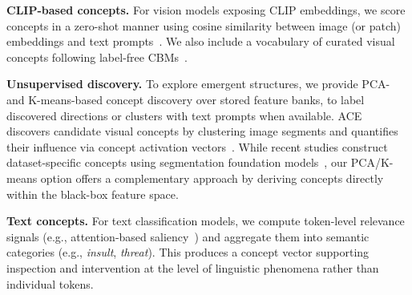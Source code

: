 \documentclass[sigconf,review,screen]{acmart}
\begin{document}
\noindent\textbf{CLIP-based concepts.}
For vision models exposing CLIP embeddings, we score concepts in a zero-shot manner using cosine similarity between image (or patch) embeddings and text prompts~\cite{radford_learning_2021}. We also include a vocabulary of curated visual concepts following label-free CBMs~\cite{oikarinen_label-free_2022}.

\noindent\textbf{Unsupervised discovery.}
To explore emergent structures, we provide PCA- and K-means-based concept discovery over stored feature banks, to label discovered directions or clusters with text prompts when available. ACE~\cite{Ghorbani2019ACE} discovers candidate visual concepts by clustering image segments and quantifies their influence via concept activation vectors~\cite{Kim2018TCAV}. 
While recent studies construct dataset-specific concepts using segmentation foundation models~\cite{Prasse2024DCBM}, our PCA/K-means option offers a complementary approach by deriving concepts directly within the black-box feature space.

\noindent\textbf{Text concepts.}
For text classification models, we compute token-level relevance signals (e.g., attention-based saliency~\cite{Vaswani2017Attention,Jain2019AttentionNotExplanation}) and aggregate them into semantic categories (e.g., \emph{insult}, \emph{threat}). This produces a concept vector supporting inspection and intervention at the level of linguistic phenomena rather than individual tokens.


\end{document}
